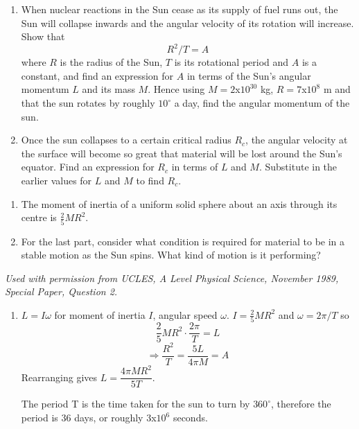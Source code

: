 \begin{hint}
{
\begin{enumerate}
\item When nuclear reactions in the Sun cease as its supply of fuel runs out, the Sun will collapse inwards and the angular velocity of its rotation will increase. Show that 
\begin{equation*}
R^2/T=A
\end{equation*}
where $R$ is the radius of the Sun, $T$ is its rotational period and $A$ is a constant, and find an expression for $A$ in terms of the Sun's angular momentum $L$ and its mass $M$. Hence using $M = 2 $x$10^{30}$ kg, $R = 7 $x$10^{8}$ m and that the sun rotates by roughly $10^{\circ}$ a day, find the angular momentum of the sun.
\item Once the sun collapses to a certain critical radius $R_c$, the angular velocity at the surface will become so great that material will be lost around the Sun's equator. Find an expression for $R_c$ in terms of $L$ and $M$. Substitute in the earlier values for $L$ and $M$ to find $R_c$.
\end{enumerate}
}
{
\begin{enumerate}
\item The moment of inertia of a uniform solid sphere about an axis through its centre is $\frac{2}{5}MR^2$.
\item For the last part, consider what condition is required for material to be in a stable motion as the Sun spins. What kind of motion is it performing?
\end{enumerate}
}
{\textit{Used with permission from UCLES, A Level Physical Science, November 1989, Special Paper, Question 2.}}
{ %
\begin{enumerate}
\item $L=I\omega$ for moment of inertia $I$, angular speed $\omega$. $I=\frac{2}{5}MR^2$ and $\omega=2\pi/T$ so
 \begin{equation*} \frac{2}{5}MR^2\cdot\frac{2\pi}{T}=L
\end{equation*}
\begin{equation*} \Rightarrow \frac{R^2}{T}=\frac{5L}{4\pi M}=A
\end{equation*}
Rearranging gives $L = \dfrac{4\pi M R^2}{5T}$.

The period T is the time taken for the sun to turn by $360^{\circ}$, therefore the period is 36 days, or roughly $3$x$10^6$ seconds.


\end{enumerate}}
\end{hint}
